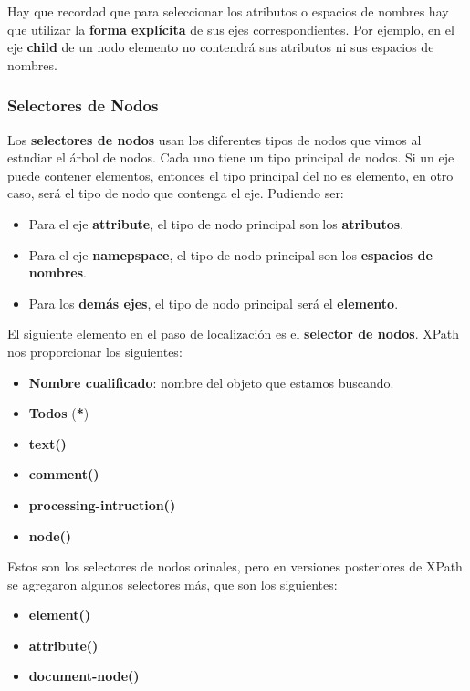 Hay que recordad que para seleccionar los atributos o espacios de nombres hay que utilizar  la \textbf{forma explícita}  de sus ejes correspondientes. Por ejemplo, en el eje \textbf{child} de un nodo elemento no contendrá sus atributos ni sus espacios de nombres.

\subsubsection{Selectores de Nodos}
Los \textbf{selectores de nodos} usan los diferentes tipos de nodos que vimos al estudiar el árbol de nodos. Cada uno tiene un tipo principal de nodos. Si un eje puede contener elementos, entonces el tipo principal del no es elemento, en otro caso, será el tipo de nodo que contenga el eje. Pudiendo ser:

\begin{itemize}
    \item Para el eje \textbf{attribute}, el tipo de nodo principal son los \textbf{atributos}.
    \item Para el eje \textbf{namepspace}, el tipo de nodo principal son los \textbf{espacios de nombres}.
    \item Para los \textbf{demás ejes}, el tipo de nodo principal será el \textbf{elemento}.
\end{itemize}

El siguiente elemento en el paso de localización es el \textbf{selector de nodos}. XPath nos proporcionar los siguientes:

\begin{itemize}
    \item \textbf{Nombre cualificado}: nombre del objeto que estamos buscando.
    \item \textbf{Todos} (\textbf{*})
    \item \textbf{text()}
    \item \textbf{comment()}
    \item \textbf{processing-intruction()}
    \item \textbf{node()}
\end{itemize}

Estos son los selectores de nodos orinales, pero en versiones posteriores de XPath se agregaron algunos selectores más, que son los siguientes:

\begin{itemize}
    \item \textbf{element()}
    \item \textbf{attribute()}
    \item \textbf{document-node()}
\end{itemize}

